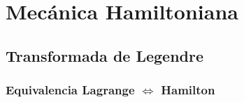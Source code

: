 \chapter{Mecánica Hamiltoniana}

\section{Transformada de Legendre}
\subsection{Equivalencia Lagrange $\iff$ Hamilton}
